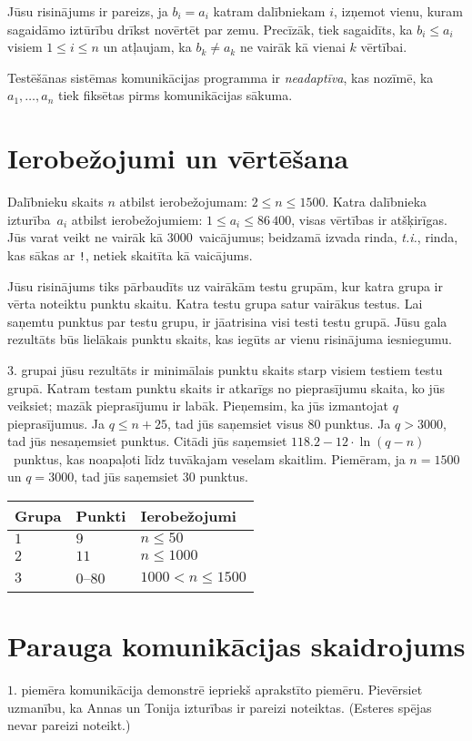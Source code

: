 Jūsu risinājums ir pareizs, ja $b_i=a_i$ katram dalībniekam $i$, izņemot vienu, kuram sagaidāmo iztūrību drīkst novērtēt par zemu. Precīzāk, tiek sagaidīts, ka $b_i\leq a_i$ visiem $1\leq i\leq n$ un atļaujam, ka $b_k \neq a_k$ ne vairāk kā vienai $k$ vērtībai.

Testēšānas sistēmas komunikācijas programma ir \emph{neadaptīva}, kas nozīmē, ka $a_1,\ldots, a_n$ tiek fiksētas pirms komunikācijas sākuma.


\section*{Ierobežojumi un vērtēšana}

Dalībnieku skaits $n$ atbilst ierobežojumam:
$2\leq n\leq 1500$. %
Katra dalībnieka izturība~$a_i$ atbilst ierobežojumiem: 
$1\leq a_i\leq 86\,400$, %
visas vērtības ir atšķirīgas. %
Jūs varat veikt 
ne vairāk kā $3000$~vaicājumus; %
beidzamā izvada rinda, \emph{t.i.}, rinda, kas sākas ar \texttt{!}, netiek skaitīta kā vaicājums.

Jūsu risinājums tiks pārbaudīts uz vairākām testu grupām, kur katra grupa ir vērta noteiktu punktu skaitu.
Katra testu grupa satur vairākus testus.
Lai saņemtu punktus par testu grupu, ir jāatrisina visi testi testu grupā.
Jūsu gala rezultāts būs lielākais punktu skaits, kas iegūts ar vienu risinājuma iesniegumu.

$3.$ grupai jūsu rezultāts ir minimālais punktu skaits starp visiem testiem testu grupā.
Katram testam punktu skaits ir atkarīgs no pieprasījumu skaita, ko jūs veiksiet; 
mazāk pieprasījumu ir labāk.
Pieņemsim, ka jūs izmantojat $q$ pieprasījumus.
Ja $q \le n+25$, tad jūs saņemsiet visus $80$ punktus.
Ja $q > 3000$, tad jūs nesaņemsiet punktus.
Citādi jūs saņemsiet 
$118.2 - 12 \cdot \ln(q - n)$~punktus, kas noapaļoti līdz tuvākajam veselam skaitlim. %
Piemēram, ja $n = 1500$ un $q = 3000$, tad jūs saņemsiet $30$ punktus.

\medskip
\begin{tabular}{lll}
Grupa & Punkti & Ierobežojumi\\\hline
$1$  &  $9$ & $n\leq 50$\\
$2$  &  $11$ & $n\leq 1000$\\
$3$  &  $0$--$80$ & $1000 < n\leq 1500$\\
\end{tabular}

\section*{Parauga komunikācijas skaidrojums}

$1.$ piemēra komunikācija demonstrē iepriekš aprakstīto piemēru.
Pievērsiet uzmanību, ka Annas un Tonija izturības ir pareizi noteiktas.
(Esteres spējas nevar pareizi noteikt.)
